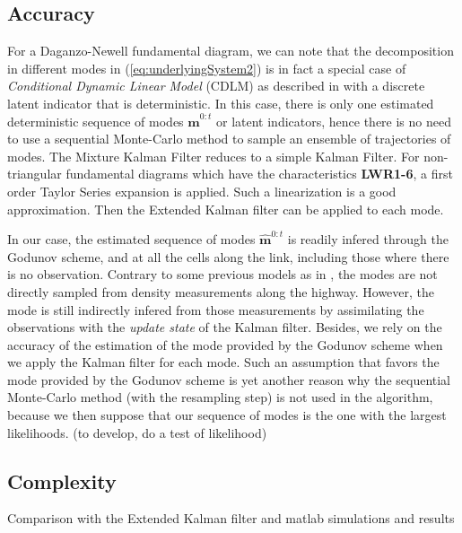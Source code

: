 \subsection{Accuracy}

For a Daganzo-Newell fundamental diagram, we can note that the decomposition in different modes in (\ref{eq:underlyingSystem2}) is in fact a special case of \textit{Conditional Dynamic Linear Model} (CDLM) as described in \cite{Chen2000} with a discrete latent indicator that is deterministic. In this case, there is only one estimated deterministic sequence of modes $\hat{\boldsymbol m}^{0:t}$ or latent indicators, hence there is no need to use a sequential Monte-Carlo method to sample an ensemble of trajectories of modes. The Mixture Kalman Filter \cite{Chen2000} reduces to a simple Kalman Filter. For non-triangular fundamental diagrams which have the characteristics \textbf{LWR1-6}, a first order Taylor Series expansion is applied. Such a linearization is a good approximation. Then the Extended Kalman filter can be applied to each mode.

In our case, the estimated sequence of modes $\hat{\boldsymbol m}^{0:t}$ is readily infered through the Godunov scheme, and at all the cells along the link, including those where there is no observation. Contrary to some previous models as in \cite{Munoz2003}, the modes are not directly sampled from density measurements along the highway. However, the mode is still indirectly infered from those measurements by assimilating the observations with the \textit{update state} of the Kalman filter. Besides, we rely on the accuracy of the estimation of the mode provided by the Godunov scheme when we apply the Kalman filter for each mode. Such an assumption that favors the mode provided by the Godunov scheme is yet another reason why the sequential Monte-Carlo method (with the resampling step) is not used in the algorithm, because we then suppose that our sequence of modes is the one with the largest likelihoods. (to develop, do a test of likelihood)

\subsection{Complexity}

Comparison with the Extended Kalman filter and matlab simulations and results